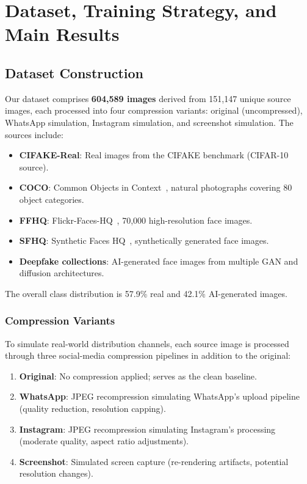 
\chapter{Dataset, Training Strategy, and Main Results}\label{chap:data}


\section{Dataset Construction}\label{sec:dataset}

Our dataset comprises \textbf{604,589 images} derived from 151,147 unique source images, each processed into four compression variants: original (uncompressed), WhatsApp simulation, Instagram simulation, and screenshot simulation. The sources include:

\begin{itemize}
    \item \textbf{CIFAKE-Real}: Real images from the CIFAKE benchmark (CIFAR-10 source).
    \item \textbf{COCO}: Common Objects in Context~\cite{lin2014coco}, natural photographs covering 80 object categories.
    \item \textbf{FFHQ}: Flickr-Faces-HQ~\cite{karras2019ffhq}, 70,000 high-resolution face images.
    \item \textbf{SFHQ}: Synthetic Faces HQ~\cite{david2022sfhq}, synthetically generated face images.
    \item \textbf{Deepfake collections}: AI-generated face images from multiple GAN and diffusion architectures.
\end{itemize}

The overall class distribution is 57.9\% real and 42.1\% AI-generated images.

\subsection{Compression Variants}\label{sec:variants}

To simulate real-world distribution channels, each source image is processed through three social-media compression pipelines in addition to the original:

\begin{enumerate}
    \item \textbf{Original}: No compression applied; serves as the clean baseline.
    \item \textbf{WhatsApp}: JPEG recompression simulating WhatsApp's upload pipeline (quality reduction, resolution capping).
    \item \textbf{Instagram}: JPEG recompression simulating Instagram's processing (moderate quality, aspect ratio adjustments).
    \item \textbf{Screenshot}: Simulated screen capture (re-rendering artifacts, potential resolution changes).
\end{enumerate}

